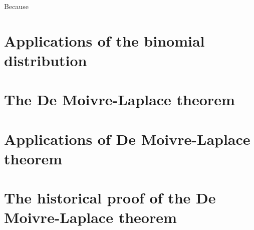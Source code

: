 Because 

\section{Applications of the binomial distribution}

\section{The De Moivre-Laplace theorem}

\section{Applications of De Moivre-Laplace theorem}

\section{The historical proof of the De Moivre-Laplace theorem}
